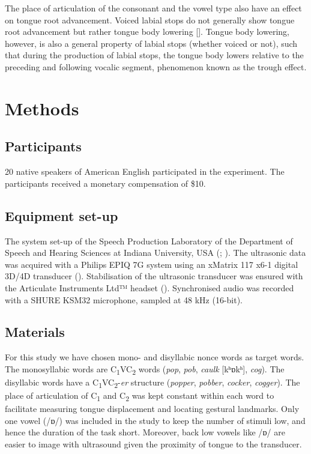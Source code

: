 \documentclass[preprint]{JASAnew}
\begin{document}
The place of articulation of the consonant and the vowel type also have
an effect on tongue root advancement. Voiced labial stops do not
generally show tongue root advancement but rather tongue body lowering
{[}{]}. Tongue body lowering, however, is also a general property of
labial stops (whether voiced or not), such that during the production of
labial stops, the tongue body lowers relative to the preceding and
following vocalic segment, phenomenon known as the trough effect.

\section{Methods}\label{methods}

\subsection{Participants}\label{participants}

20 native speakers of American English participated in the experiment.
The participants received a monetary compensation of \$10.

\subsection{Equipment set-up}\label{equipment-set-up}

The system set-up of the Speech Production Laboratory of the Department
of Speech and Hearing Sciences at Indiana University, USA
(\citet{lulich2017}; \citet{charles2018}). The ultrasonic data was
acquired with a Philips EPIQ 7G system using an xMatrix 117 x6-1 digital
3D/4D transducer (). Stabilisation of the ultrasonic transducer was
ensured with the Articulate Instruments Ltd™ headset
(\citeyear{articulate2008}). Synchronised audio was recorded with a
SHURE KSM32 microphone, sampled at 48 kHz (16-bit).

\subsection{Materials}\label{materials}

For this study we have chosen mono- and disyllabic nonce words as target
words. The monosyllabic words are C\textsubscript{1}VC\textsubscript{2}
words (\emph{pop}, \emph{pob}, \emph{caulk} {[}kʰɒkʰ{]}, \emph{cog}).
The disyllabic words have a
C\textsubscript{1}VC\textsubscript{2}-\emph{er} structure
(\emph{popper}, \emph{pobber}, \emph{cocker}, \emph{cogger}). The place
of articulation of C\textsubscript{1} and C\textsubscript{2} was kept
constant within each word to facilitate measuring tongue displacement
and locating gestural landmarks. Only one vowel (/ɒ/) was included in
the study to keep the number of stimuli low, and hence the duration of
the task short. Moreover, back low vowels like /ɒ/ are easier to image
with ultrasound given the proximity of tongue to the transducer.
\end{document}
